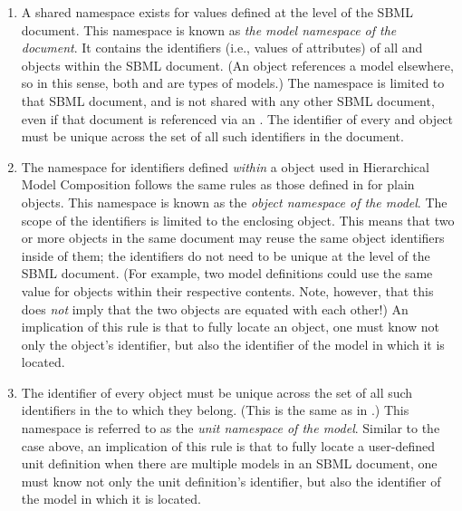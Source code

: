 \begin{enumerate}

\item A shared namespace exists for  values defined at the
  level of the SBML document.  This namespace is known as \emph{the
    model namespace of the document}.  It contains the identifiers
  (i.e., values of  attributes) of all \Model and
  \ExternalModelDefinition objects within the SBML document.  (An
  \ExternalModelDefinition object references a model elsewhere, so in
  this sense, both \Model and \ExternalModelDefinition are types of
  models.)  The namespace is limited to that SBML document, and is not
  shared with any other SBML document, even if that document is
  referenced via an \ExternalModelDefinition.  The identifier of every
  \Model and \ExternalModelDefinition object must be unique across the
  set of all such identifiers in the document.

\item The namespace for  identifiers defined \emph{within}
  a \Model object used in Hierarchical Model Composition follows the
  same rules as those defined in \sbmlthreecore for plain \Model
  objects.  This namespace is known as the \emph{object namespace of the
    model}.  The scope of the identifiers is limited to the enclosing
  \Model object.  This means that two or more \Model objects in the same
  document may reuse the same object identifiers inside of them; the
  identifiers do not need to be unique at the level of the SBML
  document.  (For example, two model definitions could use the same
   value for \Parameter objects within their respective
  contents.  Note, however, that this does \emph{not} imply that the two
  objects are equated with each other!)  An implication of this rule is
  that to fully locate an object, one must know not only the object's
  identifier, but also the identifier of the model in which it is
  located.

\item The identifier of every \UnitDefinition object must be unique
  across the set of all such identifiers in the \Model to which they
  belong.  (This is the same as in \sbmlthreecore.)  This namespace is
  referred to as the \emph{unit namespace of the model}.  Similar to the
  case above, an implication of this rule is that to fully locate a
  user-defined unit definition when there are multiple models in an SBML
  document, one must know not only the unit definition's identifier, but
  also the identifier of the model in which it is located.


\end{enumerate}
